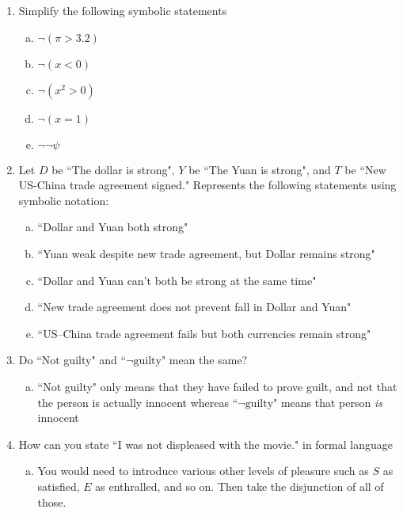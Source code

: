 \documentclass[]{article}
\begin{document}
\begin{enumerate}
  \item Simplify the following symbolic statements
  \begin {enumerate}[(a)]
  	\item $\neg(\pi > 3.2)$ 
  	\item $\neg(x < 0)$ 
  	\item $\neg(x^2 > 0)$ 
  	\item $\neg(x = 1)$ 
  	\item $\neg\neg\psi$ \answerbox{$\psi$}
  \end {enumerate}
  \setcounter{enumi}{10}
  \item Let $D$ be ``The dollar is strong", $Y$ be ``The Yuan is strong", and $T$ be ``New US-China trade agreement signed." Represents the following statements using symbolic notation:
  \begin{enumerate}[(a)]
  	\item ``Dollar and Yuan both strong"
  	\item ``Yuan weak despite new trade agreement, but Dollar remains strong" 
  	\item ``Dollar and Yuan can't both be strong at the same time" \\
 	\item ``New trade agreement does not prevent fall in Dollar and Yuan" 
 	\item ``US--China trade agreement fails but both currencies remain strong" 
  \end{enumerate}
  \item Do ``Not guilty" and ``$\neg \text{guilty}$" mean the same?
  \begin{enumerate}[(a)]
  	\item ``Not guilty" only means that they have failed to prove guilt, and not that the person is actually innocent whereas ``$\neg \text{guilty}$" means that person \textit{is} innocent
  \end{enumerate}
  \item How can you state ``I was not displeased with the movie." in formal language
  \begin{enumerate}[(a)]
  	\item You would need to introduce various other levels of pleasure such as $S$ as satisfied, $E$ as enthralled, and so on. Then take the disjunction of all of those.
  \end{enumerate}
\end{enumerate}
\end{document}
